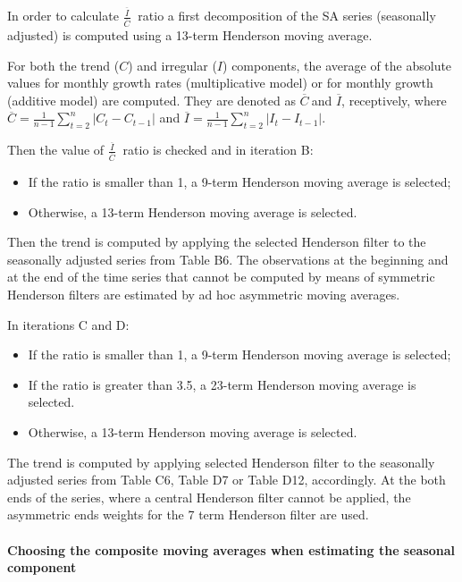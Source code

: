 \documentclass[
]{book}
\begin{document}
In order to calculate \(\frac{\overline{I}}{\overline{C}}\ \) ratio a
first decomposition of the SA series (seasonally adjusted) is computed
using a 13-term Henderson moving average.

For both the trend (\(C\)) and irregular (\(I\)) components, the average of
the absolute values for monthly growth rates (multiplicative model) or
for monthly growth (additive model) are computed. They are denoted as
\(\overline{C}\ \)and \(\overline{I}\), receptively, where
\(\overline{C} = \frac{1}{n - 1}\sum_{t = 2}^{n}\left| C_{t} - C_{t - 1} \right|\)
and
\(\overline{I} = \frac{1}{n - 1}\sum_{t = 2}^{n}\left| I_{t} - I_{t - 1} \right|\).

Then the value of \(\frac{\overline{I}}{\overline{C}}\ \) ratio is checked
and in iteration B:

\begin{itemize}
\item
  If the ratio is smaller than 1, a 9-term Henderson moving average is selected;
\item
  Otherwise, a 13-term Henderson moving average is selected.
\end{itemize}

Then the trend is computed by applying the selected Henderson filter to
the seasonally adjusted series from Table B6. The observations at the
beginning and at the end of the time series that cannot be computed by
means of symmetric Henderson filters are estimated by ad hoc asymmetric
moving averages.

In iterations C and D:

\begin{itemize}
\item
  If the ratio is smaller than 1, a 9-term Henderson moving average is selected;
\item
  If the ratio is greater than 3.5, a 23-term Henderson moving average is selected.
\item
  Otherwise, a 13-term Henderson moving average is selected.
\end{itemize}

The trend is computed by applying selected Henderson filter to the
seasonally adjusted series from Table C6, Table D7 or Table D12,
accordingly. At the both ends of the series, where a central Henderson
filter cannot be applied, the asymmetric ends weights for the 7 term
Henderson filter are used.

\hypertarget{choosing-the-composite-moving-averages-when-estimating-the-seasonal-component}{%
\paragraph{\texorpdfstring{\textbf{Choosing the composite moving averages when estimating the seasonal component}}{Choosing the composite moving averages when estimating the seasonal component}}\label{choosing-the-composite-moving-averages-when-estimating-the-seasonal-component}}
\end{document}
